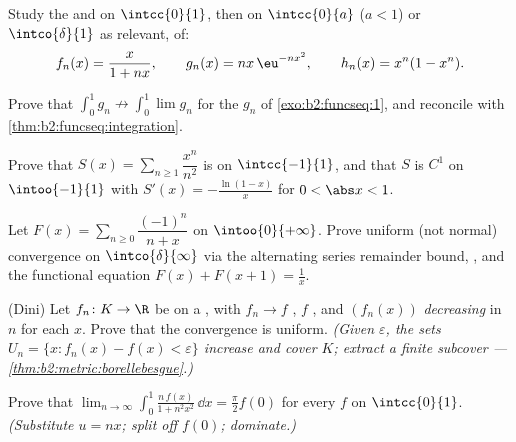 \begin{exercise}[$\star$]\label{exo:b2:funcseq:1}
Study the  and  on $\intcc{0}{1}$, then
on $\intcc{0}{a}$ ($a < 1$) or $\intco{\delta}{1}$ as relevant, of:
\[
f_n(x) = \frac{x}{1 + nx},
\qquad
g_n(x) = n x\,\eu^{-n x^2},
\qquad
h_n(x) = x^n(1 - x^n).
\]
\end{exercise}

\begin{exercise}[$\star$]\label{exo:b2:funcseq:2}
Prove that $\displaystyle\int_0^1 g_n \not\to \int_0^1 \lim g_n$
for the $g_n$ of \cref{exo:b2:funcseq:1}, and reconcile with
\cref{thm:b2:funcseq:integration}.
\end{exercise}

\begin{exercise}[$\star$]\label{exo:b2:funcseq:3}
Prove that $S(x) = \sum_{n\geq1} \dfrac{x^n}{n^2}$ is  on
$\intcc{-1}{1}$, and that $S$ is $C^1$ on $\intoo{-1}{1}$ with
$S'(x) = -\frac{\ln(1-x)}{x}$ for $0 < \abs x < 1$.
\end{exercise}

\begin{exercise}[$\star\star$]\label{exo:b2:funcseq:4}
Let $F(x) = \sum_{n \geq 0} \dfrac{(-1)^n}{n + x}$ on
$\intoo{0}{+\infty}$. Prove uniform (not normal) convergence on
$\intco{\delta}{\infty}$ via the alternating series remainder
bound, , and the functional equation $F(x) + F(x + 1) =
\frac1x$.
\end{exercise}

\begin{exercise}[$\star\star$]\label{exo:b2:funcseq:5}
(Dini) Let $f_n \colon K \to \R$ be  on a \emph{}
, with $f_n \to f$ \emph{}, $f$ ,
and $(f_n(x))$ \emph{decreasing} in $n$ for each $x$. Prove that
the convergence is uniform. \emph{(Given $\varepsilon$, the 
sets $U_n = \{x : f_n(x) - f(x) < \varepsilon\}$ increase and cover
$K$; extract a finite subcover ---
\cref{thm:b2:metric:borellebesgue}.)}
\end{exercise}

\begin{exercise}[$\star\star$]\label{exo:b2:funcseq:6}
Prove that $\displaystyle\lim_{n\to\infty} \int_0^1
\frac{n\,f(x)}{1 + n^2x^2}\,\dd x = \frac{\pi}{2} f(0)$ for every
 $f$ on $\intcc{0}{1}$. \emph{(Substitute $u = nx$; split
off $f(0)$; dominate.)}
\end{exercise}

